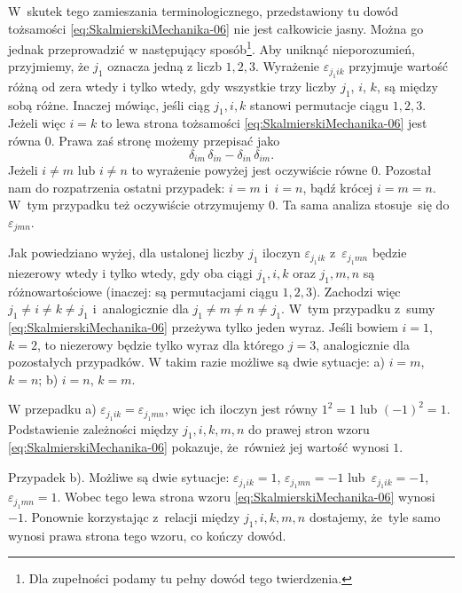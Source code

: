 \documentclass[a4paper,11pt]{article}
\begin{document}
W~skutek tego zamieszania terminologicznego, przedstawiony tu dowód
tożsamości \eqref{eq:SkalmierskiMechanika-06} nie jest całkowicie jasny.
Można go jednak przeprowadzić w następujący sposób\footnote{Dla zupełności
  podamy tu pełny dowód tego twierdzenia.}. Aby uniknąć nieporozumień,
przyjmiemy, że $j_{ 1 }$ oznacza jedną z liczb $1, 2, 3$. Wyrażenie
$\varepsilon_{ j_{ 1 } i k }$ przyjmuje wartość różną od zera wtedy i tylko wtedy, gdy
wszystkie trzy liczby $j_{ 1 }$, $i$, $k$, są między sobą różne. Inaczej
mówiąc, jeśli ciąg $j_{ 1 }, i, k$ stanowi permutacje ciągu $1, 2, 3$.
Jeżeli więc $i = k$ to lewa strona tożsamości
\eqref{eq:SkalmierskiMechanika-06} jest równa 0.
Prawa zaś stronę możemy przepisać jako
\begin{equation}
  \label{eq:SkalmierskiMechanika-07}
  \delta_{ i m } \, \delta_{ i n } - \delta_{ i n } \, \delta_{ i m }.
\end{equation}
Jeżeli $i \neq m$ lub $i \neq n$ to wyrażenie powyżej jest oczywiście równe 0.
Pozostał nam do rozpatrzenia ostatni przypadek: $i = m$ i~$i = n$, bądź
krócej $i = m = n$. W~tym przypadku też oczywiście otrzymujemy 0. Ta sama
analiza stosuje~się do $\varepsilon_{ j m n }$.

Jak powiedziano wyżej, dla ustalonej liczby $j_{ 1 }$ iloczyn
$\varepsilon_{ j_{ 1 } i k }$ z~$\varepsilon_{ j_{ 1 } m n }$ będzie niezerowy wtedy i tylko wtedy,
gdy oba ciągi $j_{ 1 }, i, k$ oraz $j_{ 1 }, m, n$ są różnowartościowe
(inaczej: są permutacjami ciągu $1, 2, 3$). Zachodzi więc
$j_{ 1 } \neq i \neq k \neq j_{ 1 }$ i~analogicznie dla $j_{ 1 } \neq m \neq n \neq j_{ 1 }$.
W~tym przypadku z~sumy \eqref{eq:SkalmierskiMechanika-06} przeżywa tylko
jeden wyraz. Jeśli bowiem $i = 1$, $k = 2$, to niezerowy będzie tylko wyraz
dla którego $j = 3$, analogicznie dla pozostałych przypadków. W takim razie
możliwe są dwie sytuacje: a) $i = m$, $k = n$; b) $i = n$, $k = m$.

W przepadku a) $\varepsilon_{ j_{ 1 } i k } = \varepsilon_{ j_{ 1 } m n }$, więc ich iloczyn jest
równy $1^{ 2 } = 1$ lub $( -1 )^{ 2 } = 1$. Podstawienie zależności między
$j_{ 1 }, i, k, m, n$ do prawej stron wzoru
\eqref{eq:SkalmierskiMechanika-06} pokazuje, że~również jej wartość wynosi
$1$.

Przypadek b). Możliwe są dwie sytuacje:
$\varepsilon_{ j_{ 1 } i k } = 1$, $\varepsilon_{ j_{ 1 } m n } = -1$
lub~$\varepsilon_{ j_{ 1 } i k } = -1$, $\varepsilon_{ j_{ 1 } m n } = 1$. Wobec tego lewa strona wzoru
\eqref{eq:SkalmierskiMechanika-06} wynosi $-1$. Ponownie korzystając
z~relacji między $j_{ 1 }, i, k, m, n$ dostajemy, że~tyle samo wynosi prawa
strona tego wzoru, co kończy dowód.
\end{document}
